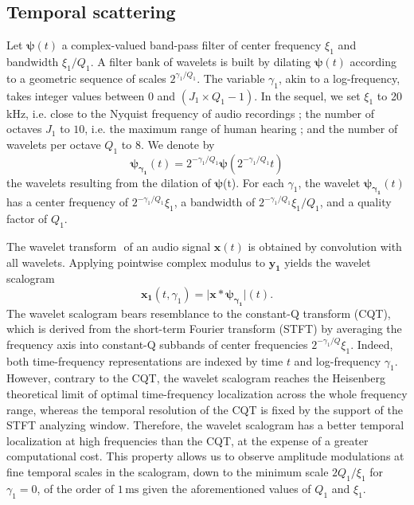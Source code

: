 \documentclass[journal]{IEEEtran}
\makeatletter
\newcommand*{\ie}{i.e.\@\xspace}
\makeatother
\begin{document}
\subsection{Temporal scattering}
Let $\boldsymbol{\psi}(t)$ a complex-valued band-pass filter of
center frequency $\xi_1$ and bandwidth $\xi_1/Q_1$.
A filter bank of wavelets is built by dilating $\boldsymbol{\psi}(t)$
according to a geometric sequence of scales $2^{\gamma_1/Q_1}$.
The variable $\gamma_1$, akin to a log-frequency, takes integer values between $0$ and $(J_1 \times Q_1 - 1)$.
In the sequel, we set $\xi_1$ to 20 kHz, \ie close to the Nyquist frequency of audio recordings ; the number of octaves $J_1$ to $10$, \ie the maximum range of human hearing ; and the number of wavelets per octave $Q_1$ to $8$.
We denote by
\begin{equation}
\boldsymbol{\psi_{\gamma_1}}(t) = 2^{-\gamma_1/Q_1} \boldsymbol{\psi}(2^{-\gamma_1/Q_1} t)
\end{equation}
the wavelets resulting from the dilation of $\boldsymbol{\psi}$(t).
For each $\gamma_1$, the wavelet $\boldsymbol{\psi_{\gamma_1}}(t)$
has a center frequency of $2^{-\gamma_1/Q_1}\xi_1$, a bandwidth of $2^{-\gamma_1/Q_1}\xi_1/Q_1$, and a quality factor of $Q_1$.

The wavelet transform $\boldsymbol{}$ of an audio signal
$\boldsymbol{x}(t)$ is obtained by convolution with all wavelets.
Applying pointwise complex modulus to $\boldsymbol{y_1}$ yields
the wavelet scalogram
\begin{equation}
\boldsymbol{x_1}(t, \gamma_1)
= \vert \boldsymbol{x} \ast \boldsymbol{\psi_{\gamma_1}} \vert (t).
\end{equation}
The wavelet scalogram bears resemblance to the constant-Q transform (CQT),
which is derived from the short-term Fourier transform (STFT) by averaging the frequency
axis into constant-Q subbands of center frequencies $2^{-\gamma_1/Q}\xi_1$.
Indeed, both time-frequency representations are indexed by time $t$ and log-frequency $\gamma_1$.
However, contrary to the CQT, the wavelet scalogram reaches the Heisenberg
theoretical limit of optimal time-frequency localization across the whole
frequency range, whereas the temporal resolution of the CQT is fixed by the support of the STFT analyzing window.
Therefore, the wavelet scalogram has a better temporal localization at high
frequencies than the CQT, at the expense of a greater computational cost.
This property allows us to observe amplitude modulations at fine temporal scales in the scalogram, down to the minimum scale $2Q_1/\xi_1$ for $\gamma_1 = 0$, of the order of $1\,\textrm{ms}$ given the aforementioned values of $Q_1$ and $\xi_1$.
\end{document}
